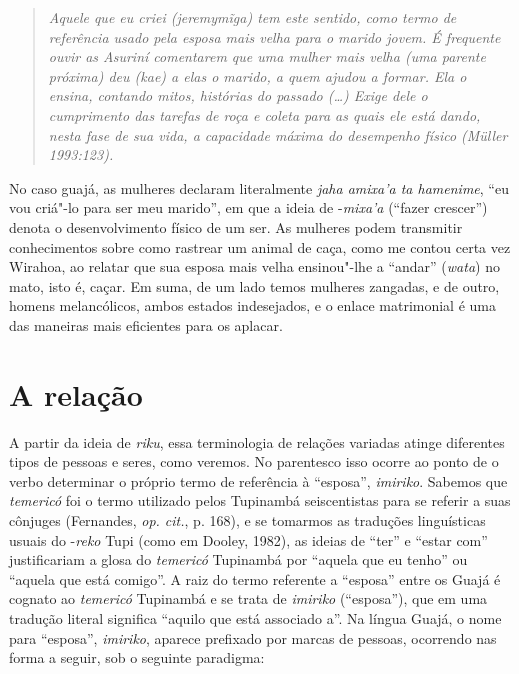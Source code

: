 \begin{quote}
\emph{Aquele que eu criei (\emph{jeremymĩga}) tem este sentido, como termo de
referência usado pela esposa mais velha para o marido jovem. É frequente
ouvir as Asuriní comentarem que uma mulher mais velha (uma parente
próxima) deu (\emph{kae}) a elas o marido, a quem ajudou a formar. Ela o
ensina, contando mitos, histórias do passado (\ldots{}) Exige dele o
cumprimento das tarefas de roça e coleta para as quais ele está dando,
nesta fase de sua vida, a capacidade máxima do desempenho físico (Müller
1993:123).}
\end{quote}

No caso guajá, as mulheres declaram literalmente \emph{jaha amixa'a ta
hamenime}, ``eu vou criá"-lo para ser meu marido'', em que a ideia de
-\emph{mixa'a} (``fazer crescer'') denota o desenvolvimento físico de um
ser. As mulheres podem transmitir conhecimentos sobre como rastrear um
animal de caça, como me contou certa vez Wirahoa, ao relatar que sua
esposa mais velha ensinou"-lhe a ``andar'' (\emph{wata}) no mato, isto é,
caçar. Em suma, de um lado temos mulheres zangadas, e de outro, homens
melancólicos, ambos estados indesejados, e o enlace matrimonial é uma
das maneiras mais eficientes para os aplacar.

\section{A relação}\label{a-relauxe7uxe3o}

A partir da ideia de \emph{riku}, essa terminologia de relações variadas
atinge diferentes tipos de pessoas e seres, como veremos. No parentesco
isso ocorre ao ponto de o verbo determinar o próprio termo de referência
à ``esposa'', \emph{imiriko}. Sabemos que \emph{temericó} foi o termo
utilizado pelos Tupinambá seiscentistas para se referir a suas cônjuges
(Fernandes, \emph{op. cit.}, p. 168), e se tomarmos as traduções linguísticas
usuais do -\emph{reko} Tupi (como em Dooley, 1982), as ideias de ``ter'' e
``estar com'' justificariam a glosa do \emph{temericó} Tupinambá por
``aquela que eu tenho'' ou ``aquela que está comigo''. A raiz do termo
referente a ``esposa'' entre os Guajá é cognato ao \emph{temericó}
Tupinambá e se trata de \emph{imiriko} (``esposa''), que em uma tradução
literal significa ``aquilo que está associado a''. Na língua Guajá, o nome
para ``esposa'', \emph{imiriko}, aparece prefixado por marcas de pessoas,
ocorrendo nas forma a seguir, sob o seguinte paradigma:

